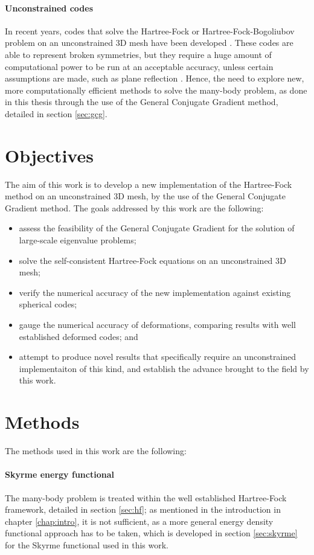 \paragraph{Unconstrained codes}
In recent years, codes that solve the Hartree-Fock or Hartree-Fock-Bogoliubov problem on an unconstrained 3D mesh have been developed \cite{Ryssens2015_EV8,Ryssens2016_MOCCa,Maruhn2014_Sky3D,Chen2022_HFBFFT}. These codes are able to represent broken symmetries, but they require a huge amount of computational power to be run at an acceptable accuracy, unless certain assumptions are made, such as plane reflection \cite{Ryssens2015_EV8,Ryssens2016_MOCCa}.
Hence, the need to explore new, more computationally efficient methods to solve the many-body problem, as done in this thesis through the use of the General Conjugate Gradient method, detailed in section \ref{sec:gcg}.
\section{Objectives}
The aim of this work is to develop a new implementation of the Hartree-Fock method on an unconstrained 3D mesh, by the use of the General Conjugate Gradient method. The goals addressed by this work are the following:
\begin{itemize}
    \item assess the feasibility of the General Conjugate Gradient for the solution of large-scale eigenvalue problems;
    \item solve the self-consistent Hartree-Fock equations on an unconstrained 3D mesh;
    \item verify the numerical accuracy of the new implementation against existing spherical codes;
    \item gauge the numerical accuracy of deformations, comparing results with well established deformed codes; and
    \item attempt to produce novel results that specifically require an unconstrained implementaiton of this kind, and establish the advance brought to the field by this work.
\end{itemize}
\section{Methods}
The methods used in this work are the following:
\paragraph{Skyrme energy functional} The many-body problem is treated within the well established Hartree-Fock framework, detailed in section \ref{sec:hf}; as mentioned in the introduction in chapter \ref{chap:intro}, it is not sufficient, as a more general energy density functional approach has to be taken, which is developed in section \ref{sec:skyrme} for the Skyrme functional used in this work.
